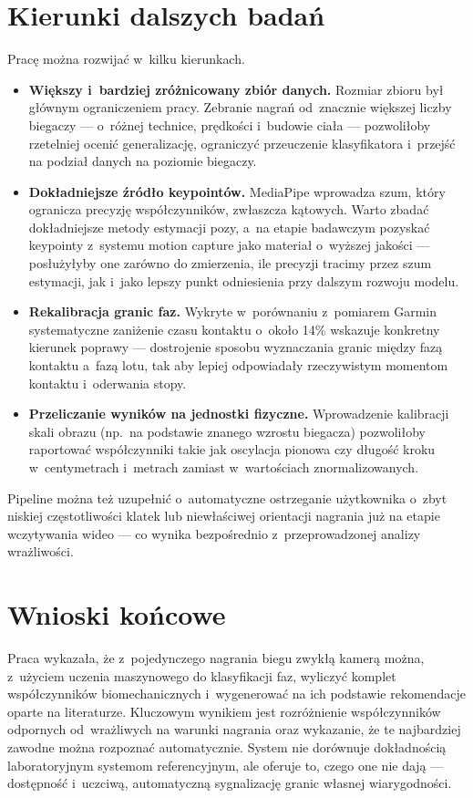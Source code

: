 \section{Kierunki dalszych badań}
\label{sec:praca-przyszla}

Pracę można rozwijać w~kilku kierunkach.

\begin{itemize}
    \item \textbf{Większy i~bardziej zróżnicowany zbiór danych.} Rozmiar zbioru był głównym ograniczeniem pracy. Zebranie nagrań od~znacznie większej liczby biegaczy --- o~różnej technice, prędkości i~budowie ciała --- pozwoliłoby rzetelniej ocenić generalizację, ograniczyć przeuczenie klasyfikatora i~przejść na podział danych na poziomie biegaczy.
    \\
    \item \textbf{Dokładniejsze źródło keypointów.} MediaPipe wprowadza szum, który ogranicza precyzję współczynników, zwłaszcza kątowych. Warto zbadać dokładniejsze metody estymacji pozy, a~na etapie badawczym pozyskać keypointy z~systemu motion capture jako materiał o~wyższej jakości --- posłużyłyby one zarówno do zmierzenia, ile precyzji tracimy przez szum estymacji, jak i~jako lepszy punkt odniesienia przy dalszym rozwoju modelu.
    \item \textbf{Rekalibracja granic faz.} Wykryte w~porównaniu z~pomiarem Garmin systematyczne zaniżenie czasu kontaktu o~około 14\% wskazuje konkretny kierunek poprawy --- dostrojenie sposobu wyznaczania granic między fazą kontaktu a~fazą lotu, tak aby lepiej odpowiadały rzeczywistym momentom kontaktu i~oderwania stopy.
    \item \textbf{Przeliczanie wyników na jednostki fizyczne.} Wprowadzenie kalibracji skali obrazu (np.~na podstawie znanego wzrostu biegacza) pozwoliłoby raportować współczynniki takie jak oscylacja pionowa czy długość kroku w~centymetrach i~metrach zamiast w~wartościach znormalizowanych.
\end{itemize}

Pipeline można też uzupełnić o~automatyczne ostrzeganie użytkownika o~zbyt niskiej częstotliwości klatek lub niewłaściwej orientacji nagrania już na etapie wczytywania wideo --- co wynika bezpośrednio z~przeprowadzonej analizy wrażliwości.

\section{Wnioski końcowe}
\label{sec:wnioski-koncowe}

Praca wykazała, że z~pojedynczego nagrania biegu zwykłą kamerą można, z~użyciem uczenia maszynowego do klasyfikacji faz, wyliczyć komplet współczynników biomechanicznych i~wygenerować na ich podstawie rekomendacje oparte na literaturze. Kluczowym wynikiem jest rozróżnienie współczynników odpornych od~wrażliwych na warunki nagrania oraz wykazanie, że te najbardziej zawodne można rozpoznać automatycznie. System nie dorównuje dokładnością laboratoryjnym systemom referencyjnym, ale oferuje to, czego one nie dają --- dostępność i~uczciwą, automatyczną sygnalizację granic własnej wiarygodności.
